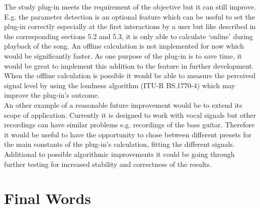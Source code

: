 The study plug-in meets the requirement of the objective but it can still improve.\\
E.g. the parameter detection is an optional feature which can be useful to set the plug-in correctly especially at the first interactions by a user but like described in the corresponding sections 5.2 and 5.3, it is only able to calculate ‘online’ during playback of the song. An offline calculation is not implemented for now which would be significantly faster. As one purpose of the plug-in is to save time, it would be great to implement this addition to the feature in further development. When the offline calculation is possible it would be able to measure the perceived signal level by using the loudness algorithm (ITU-R BS.1770-4) which may improve the plug-in’s outcome.\\
An other example of a reasonable future improvement would be to extend its scope of application. Currently it is designed to work with vocal signals but other recordings can have similar problems e.g. recordings of the bass guitar. Therefore it would be useful to have the opportunity to chose between different presets for the main constants of the plug-in’s calculation, fitting the different signals.\\
Additional to possible algorithmic improvements it could be going through further testing for increased stability and correctness of the results.\\

\section{Final Words}




